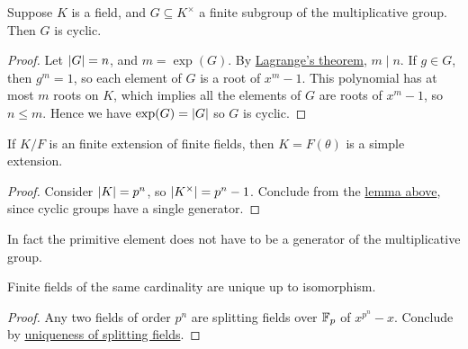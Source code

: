 \begin{lemma}\label{lem:finite-mult-group-cyclic}
    Suppose \(K\) is a field,
    and \(G \subseteq K^\times\) a finite subgroup of the multiplicative group.
    Then \(G\) is cyclic.
\end{lemma}
\begin{proof}
    Let \(\abs{G} = n\), and \(m = \exp(G)\).
    By \hyperref[cor:order-element-group]{Lagrange's theorem}, \(m \mid n\).
    If \(g \in G\), then \(g^m = 1\), so each element of \(G\) is a root of \(x^m - 1\).
    This polynomial has at most \(m\) roots on \(K\),
    which implies all the elements of \(G\) are roots of \(x^m - 1\), so \(n \leq m\).
    Hence we have \(\exp(G) = \abs{G}\) so \(G\) is cyclic.
\end{proof}
\begin{corollary}\label{cor:finite-field-simple}
    If \(K/F\) is an finite extension of finite fields,
    then \(K = F(\theta)\) is a simple extension.
\end{corollary}
\begin{proof}
    Consider \(\abs{K} = p^n\), so \(\abs{K^\times} = p^n - 1\).
    Conclude from the \hyperref[lem:finite-mult-group-cyclic]{lemma above},
    since cyclic groups have a single generator.
\end{proof}
\begin{remark}
    In fact the primitive element does not have to be a generator of the multiplicative group.
\end{remark}
\begin{corollary}\label{cor:uniqueness-finite-field}
    Finite fields of the same cardinality are unique up to isomorphism.
\end{corollary}
\begin{proof}
    Any two fields of order \(p^n\) are splitting fields over \(\mathbb{F}_p\) of \(x^{p^n} - x\).
    Conclude by \hyperref[thm:uniqueness-splitting-field]{uniqueness of splitting fields}.
\end{proof}

